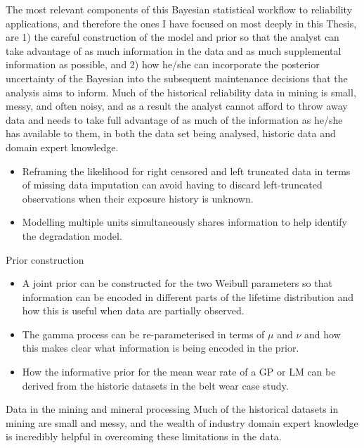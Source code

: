 The most relevant components of this Bayesian statistical workflow to reliability applications, and therefore the ones I have focused on most deeply in this Thesis, are 1) the careful construction of the model and prior so that the analyst can take advantage of as much information in the data and as much supplemental information as possible, and 2) how he/she can incorporate the posterior uncertainty of the Bayesian into the subsequent maintenance decisions that the analysis aims to inform. 
Much of the historical reliability data in mining is small, messy, and often noisy, and as a result the analyst cannot afford to throw away data and needs to take full advantage of as much of the information as he/she has available to them, in both the data set being analysed, historic data and domain expert knowledge.
\begin{itemize}
  \item Reframing the likelihood for right censored and left truncated data in terms of missing data imputation can avoid having to discard left-truncated observations when their exposure history is unknown.
  \item Modelling multiple units simultaneously shares information to help identify the degradation model.
\end{itemize} 
Prior construction
\begin{itemize}
  \item A joint prior can be constructed for the two Weibull parameters so that information can be encoded in different parts of the lifetime distribution and how this is useful when data are partially observed.
  \item The gamma process can be re-parameterised in terms of $\mu$ and $\nu$ and how this makes clear what information is being encoded in the prior.
  \item How the informative prior for the mean wear rate of a GP or LM can be derived from the historic datasets in the belt wear case study.
\end{itemize}
Data in the mining and mineral processing Much of the historical datasets in mining are small and messy, and the wealth of industry domain expert knowledge is incredibly helpful in overcoming these limitations in the data.





